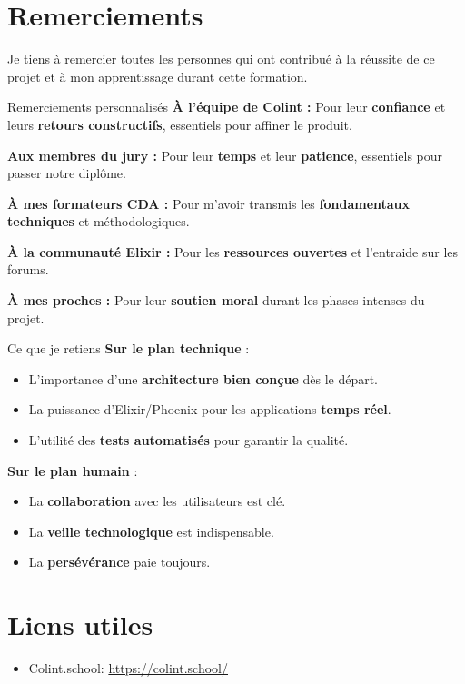 \section{Remerciements}
Je tiens à remercier toutes les personnes qui ont contribué à la réussite de ce projet et à mon apprentissage durant cette formation.
\newline

\begin{for_you}{Remerciements personnalisés}
    \textbf{À l’équipe de Colint : \newline}
    Pour leur \textbf{confiance} et leurs \textbf{retours constructifs}, essentiels pour affiner le produit.

    \textbf{Aux membres du jury : \newline}
    Pour leur \textbf{temps} et leur \textbf{patience}, essentiels pour passer notre diplôme.

    \textbf{À mes formateurs CDA : \newline}
    Pour m’avoir transmis les \textbf{fondamentaux techniques} et méthodologiques.

    \textbf{À la communauté Elixir : \newline}
    Pour les \textbf{ressources ouvertes} et l’entraide sur les forums.

    \textbf{À mes proches : \newline}
    Pour leur \textbf{soutien moral} durant les phases intenses du projet.
\end{for_you}

\textbf{\newline}

\begin{for_you}{Ce que je retiens}
    \textbf{Sur le plan technique} :
    \begin{itemize}
        \item L’importance d’une \textbf{architecture bien conçue} dès le départ.
        \item La puissance d’Elixir/Phoenix pour les applications \textbf{temps réel}.
        \item L’utilité des \textbf{tests automatisés} pour garantir la qualité.
        \newline
    \end{itemize}

    \textbf{Sur le plan humain} :
    \begin{itemize}
        \item La \textbf{collaboration} avec les utilisateurs est clé.
        \item La \textbf{veille technologique} est indispensable.
        \item La \textbf{persévérance} paie toujours.
        \newline
    \end{itemize}
\end{for_you}

\section{Liens utiles}

\begin{itemize}
    \item Colint.school: \url{https://colint.school/}
\end{itemize}
